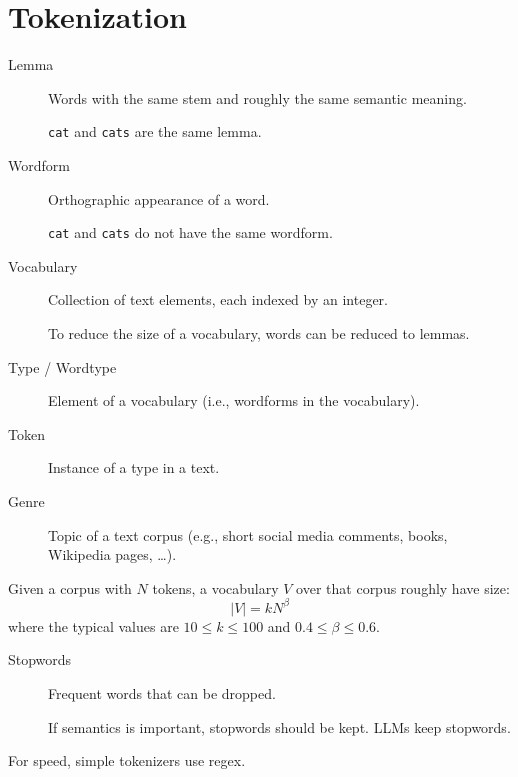 \section{Tokenization}

\begin{description}
    \item[Lemma] 
        Words with the same stem and roughly the same semantic meaning.
        \begin{example}
            \texttt{cat} and \texttt{cats} are the same lemma.
        \end{example}

    \item[Wordform] 
        Orthographic appearance of a word.
        \begin{example}
            \texttt{cat} and \texttt{cats} do not have the same wordform.
        \end{example}
    
    \item[Vocabulary] 
        Collection of text elements, each indexed by an integer.

        \begin{remark}
            To reduce the size of a vocabulary, words can be reduced to lemmas.
        \end{remark}

    \item[Type / Wordtype] 
        Element of a vocabulary (i.e., wordforms in the vocabulary).
    
    \item[Token] 
        Instance of a type in a text.

    \item[Genre] 
        Topic of a text corpus (e.g., short social media comments, books, Wikipedia pages, \dots).
\end{description}

\begin{remark}
    Given a corpus with $N$ tokens, a vocabulary $V$ over that corpus roughly have size:
    \[ \left\vert V \right\vert = kN^\beta \]
    where the typical values are $10 \leq k \leq 100$ and $0.4 \leq \beta \leq 0.6$.
\end{remark}

\begin{description}
    \item[Stopwords] 
        Frequent words that can be dropped.

        \begin{remark}
            If semantics is important, stopwords should be kept. LLMs keep stopwords.
        \end{remark}
\end{description}

\begin{remark}
    For speed, simple tokenizers use regex.
\end{remark}